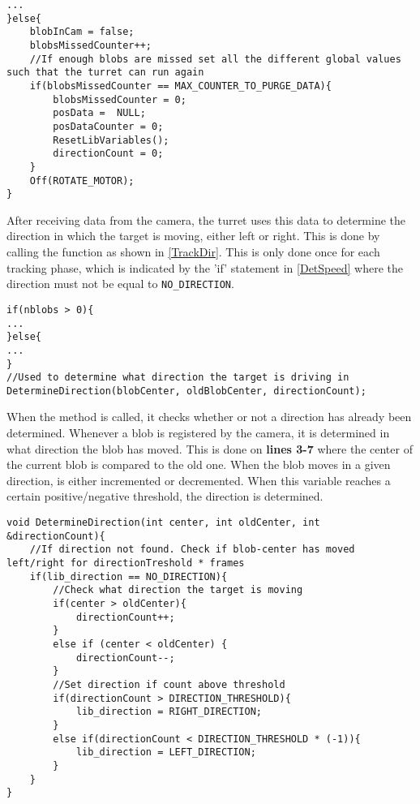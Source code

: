 \begin{minipage}[H]{\linewidth}
\begin{lstlisting}[caption = Reset data and turn off motor is no targets are found., label = PurgeData] 
...
}else{
	blobInCam = false;
    blobsMissedCounter++;
    //If enough blobs are missed set all the different global values such that the turret can run again
    if(blobsMissedCounter == MAX_COUNTER_TO_PURGE_DATA){
    	blobsMissedCounter = 0;
        posData =  NULL;
        posDataCounter = 0;
        ResetLibVariables();
        directionCount = 0;
	}
    Off(ROTATE_MOTOR);
}
\end{lstlisting}
\end{minipage}

After receiving data from the camera, the turret uses this data to determine the
direction in which the target is moving, either left or right. This is done by
calling the  function as shown in
\autoref{TrackDir}. This is only done once for each tracking phase, which is
indicated by the 'if' statement in \autoref{DetSpeed} where the direction
must not be equal to \texttt{NO\_DIRECTION}.\nl

\begin{minipage}[H]{\linewidth}
\begin{lstlisting}[caption = Call \texttt{DetermineDirection}., label =
TrackDir] 
if(nblobs > 0){
...
}else{
...
}
//Used to determine what direction the target is driving in
DetermineDirection(blobCenter, oldBlobCenter, directionCount);
\end{lstlisting}
\end{minipage}

When the  method is called, it checks
whether or not a direction has already been determined. Whenever a blob is
registered by the camera, it is determined in what direction the blob has
moved. This is done on \textbf{lines 3-7} where the center of the
current blob is compared to the old one. When the blob moves in a given
direction,  is either incremented or decremented.
When this variable reaches a certain positive/negative threshold, the direction
is determined.\nl

\begin{minipage}[H]{\linewidth}
\begin{lstlisting}[caption = Determine the targets direction., label = DeterDir]
void DetermineDirection(int center, int oldCenter, int &directionCount){
    //If direction not found. Check if blob-center has moved left/right for directionTreshold * frames
    if(lib_direction == NO_DIRECTION){
        //Check what direction the target is moving
        if(center > oldCenter){
            directionCount++;
        }
        else if (center < oldCenter) {
            directionCount--;
        }
        //Set direction if count above threshold
        if(directionCount > DIRECTION_THRESHOLD){
            lib_direction = RIGHT_DIRECTION;
        }
        else if(directionCount < DIRECTION_THRESHOLD * (-1)){
            lib_direction = LEFT_DIRECTION;
        }
    }
}
\end{lstlisting}
\end{minipage}

